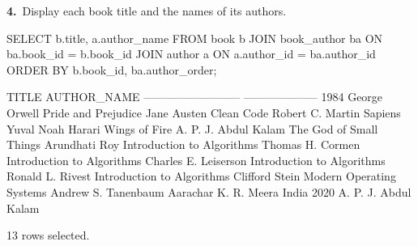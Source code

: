 \noindent\begin{minipage}{\linewidth}
\begingroup{}
{\fontsize{14}{17}\selectfont\textbf{4.}}\ Display each book title and the names of its authors.\par
\endgroup\vspace{12pt}


\begin{sqlcode}
SELECT b.title, a.author_name
FROM book b
JOIN book_author ba ON ba.book_id = b.book_id
JOIN author a ON a.author_id = ba.author_id
ORDER BY b.book_id, ba.author_order;
\end{sqlcode}

\vspace{18pt}


\begin{sqlout}[fontsize=\small]
TITLE                       AUTHOR_NAME         
--------------------------  --------------------
1984                        George Orwell
Pride and Prejudice         Jane Austen
Clean Code                  Robert C. Martin
Sapiens                     Yuval Noah Harari
Wings of Fire               A. P. J. Abdul Kalam
The God of Small Things     Arundhati Roy
Introduction to Algorithms  Thomas H. Cormen
Introduction to Algorithms  Charles E. Leiserson
Introduction to Algorithms  Ronald L. Rivest
Introduction to Algorithms  Clifford Stein
Modern Operating Systems    Andrew S. Tanenbaum
Aarachar                    K. R. Meera
India 2020                  A. P. J. Abdul Kalam

13 rows selected.
\end{sqlout}
\end{minipage}\par\vspace{24pt}

